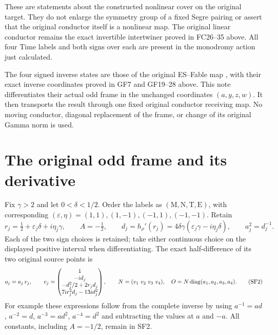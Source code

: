 These are statements about the constructed nonlinear cover on
the original target. They do not enlarge the symmetry group
of a fixed Segre pairing or assert that the original conductor
itself is a nonlinear map. The original linear conductor
remains the exact invertible intertwiner proved in
FC26--35 above. All four Time labels and both signs over each
are present in the monodromy action just calculated.

The four signed inverse states are those of the original ES--Fable
map \cite{fullfable:ES488}, with their exact inverse coordinates proved in
GF7 and GF19--28 above. This note differentiates their actual odd frame in
the unchanged coordinates $(a,y,z,w)$. It then transports the
result through one fixed original conductor receiving map. No
moving conductor, diagonal replacement of the frame, or change
of its original Gamma norm is used.

\section{The original odd frame and its derivative}
Fix $\gamma>2$ and let $0<\delta<1/2$. Order the labels as
$(\mathrm M,\mathrm N,\mathrm T,\mathrm E)$, with corresponding
$(\varepsilon,\eta)=(1,1),(1,-1),(-1,1),(-1,-1)$. Retain
\begin{equation}
 r_j=\tfrac12+\varepsilon_j\delta+i\eta_j\gamma,
 \qquad A=-\tfrac12,\qquad
 d_j=h_\rho'(r_j)=4\delta\gamma(\varepsilon_j\gamma-i\eta_j\delta),
 \qquad a_j^2=d_j^{-1}.\tag{SF1}
\end{equation}
Each of the two sign choices is retained; take either continuous
choice on the displayed positive interval when differentiating.
The exact half-difference of its two original source points is
\begin{equation}
 o_j=a_j\,v_j,\qquad
 v_j=\begin{pmatrix}
 1\\-i d_j\\-d_j^2/2+2r_jd_j\\7ir_j^2d_j-13id_j^2
 \end{pmatrix},\qquad
 N=(v_1\ v_2\ v_3\ v_4),\quad
 O=N\operatorname{diag}(a_1,a_2,a_3,a_4).\tag{SF2}
\end{equation}
For example these expressions follow from the complete inverse
by using $a^{-1}=ad$, $a^{-2}=d$, $a^{-3}=ad^2$,
$a^{-4}=d^2$ and subtracting the values at $a$ and $-a$.
All constants, including $A=-1/2$, remain in SF2.

